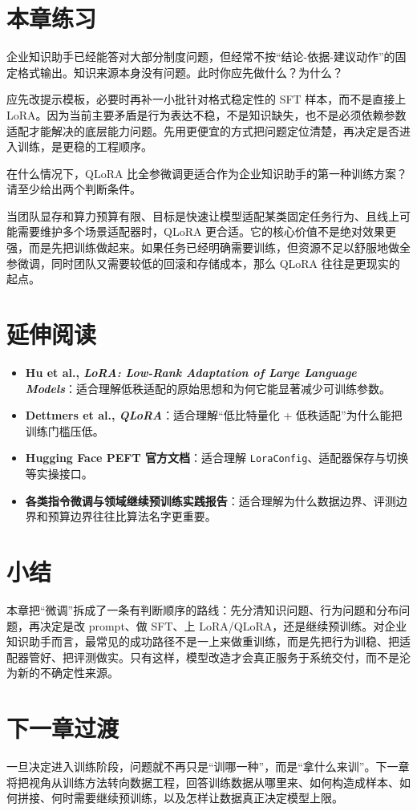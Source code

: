 \section{本章练习}
\begin{exercise}
企业知识助手已经能答对大部分制度问题，但经常不按“结论-依据-建议动作”的固定格式输出。知识来源本身没有问题。此时你应先做什么？为什么？
\end{exercise}

\begin{solution}
应先改{\heiti 提示模板}，必要时再补一小批针对格式稳定性的 SFT 样本，而不是直接上 LoRA。因为当前主要矛盾是{\heiti 行为表达不稳}，不是知识缺失，也不是必须依赖参数适配才能解决的底层能力问题。先用更便宜的方式把问题定位清楚，再决定是否进入训练，是更稳的工程顺序。
\end{solution}

\begin{exercise}
在什么情况下，QLoRA 比全参微调更适合作为企业知识助手的第一种训练方案？请至少给出两个判断条件。
\end{exercise}

\begin{solution}
当团队{\heiti 显存和算力预算有限}、目标是快速让模型适配某类固定任务行为、且线上可能需要维护多个场景适配器时，QLoRA 更合适。它的核心价值不是绝对效果更强，而是{\heiti 先把训练做起来}。如果任务已经明确需要训练，但资源不足以舒服地做全参微调，同时团队又需要较低的回滚和存储成本，那么 QLoRA 往往是更现实的起点。
\end{solution}

\section{延伸阅读}
\begin{itemize}
  \item \textbf{Hu et al., \emph{LoRA: Low-Rank Adaptation of Large Language Models}}：适合理解低秩适配的原始思想和为何它能显著减少可训练参数。
  \item \textbf{Dettmers et al., \emph{QLoRA}}：适合理解“低比特量化 + 低秩适配”为什么能把训练门槛压低。
  \item \textbf{Hugging Face PEFT 官方文档}：适合理解 \texttt{LoraConfig}、适配器保存与切换等实操接口。
  \item \textbf{各类指令微调与领域继续预训练实践报告}：适合理解为什么数据边界、评测边界和预算边界往往比算法名字更重要。
\end{itemize}

\section{小结}
本章把“微调”拆成了一条有判断顺序的路线：先分清知识问题、行为问题和分布问题，再决定是改 prompt、做 SFT、上 LoRA/QLoRA，还是继续预训练。对企业知识助手而言，最常见的成功路径不是一上来做重训练，而是先把行为训稳、把适配器管好、把评测做实。只有这样，模型改造才会真正服务于系统交付，而不是沦为新的不确定性来源。

\section{下一章过渡}
一旦决定进入训练阶段，问题就不再只是“训哪一种”，而是“拿什么来训”。下一章将把视角从训练方法转向数据工程，回答训练数据从哪里来、如何构造成样本、如何拼接、何时需要继续预训练，以及怎样让数据真正决定模型上限。
